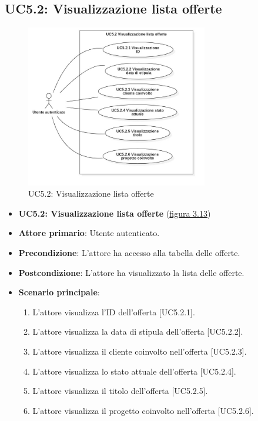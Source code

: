 \pagebreak

\subsection{UC5.2: Visualizzazione lista offerte}
\begin{figure}[!h]
\centering
\includegraphics[width=300px]{../images/UC/.jpeg/UC5.2.0-visualizzazioneListaOfferte.jpg}
\caption{UC5.2: Visualizzazione lista offerte}
\label{fig:UC5.2}
\end{figure}

\begin{itemize}
\item \textbf{UC5.2: Visualizzazione lista offerte} ({\hyperref[fig:UC5.2]{figura 3.13}})
\item \textbf{Attore primario}: Utente autenticato.
\item \textbf{Precondizione}: L'attore ha accesso alla tabella delle offerte.
\item \textbf{Postcondizione}: L'attore ha visualizzato la lista delle offerte.
\item \textbf{Scenario principale}: 
\begin{enumerate}
\item L'attore visualizza l'ID dell'offerta [UC5.2.1].
\item L'attore visualizza la data di stipula dell'offerta [UC5.2.2].
\item L'attore visualizza il cliente coinvolto nell'offerta [UC5.2.3].
\item L'attore visualizza lo stato attuale dell'offerta [UC5.2.4].
\item L'attore visualizza il titolo dell'offerta [UC5.2.5].
\item L'attore visualizza il progetto coinvolto nell'offerta [UC5.2.6].
\end{enumerate}
\end{itemize}

